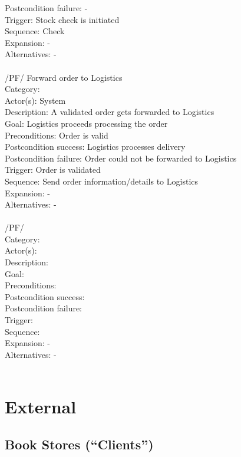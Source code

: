 \documentclass[11pt,a4paper,oneside,svgnames,draft]{report}
\begin{document}
\begin{tabbing}
	 Postcondition failure: \> -\\
	 Trigger: \> Stock check is initiated\\
	 Sequence: \> Check \\
	 Expansion: \> -\\
	 Alternatives: \> -\\
	 \\
	 /PF/ \> Forward order to Logistics\\ 
	 Category: \> \\
	 Actor(s): \> System\\ 
	 Description: \> A validated order gets forwarded to Logistics\\ 
	 Goal: \> Logistics proceeds processing the order\\
	 Preconditions: \> Order is valid\\
	 Postcondition success: \> Logistics processes delivery\\
	 Postcondition failure: \> Order could not be forwarded to Logistics\\
	 Trigger: \> Order is validated\\
	 Sequence: \> Send order information/details to Logistics\\
	 Expansion: \> -\\
	 Alternatives: \> -\\
	 \\
	 /PF/ \> \\ 
	 Category: \> \\
	 Actor(s): \> \\ 
	 Description: \> \\ 
	 Goal: \> \\
	 Preconditions: \> \\
	 Postcondition success: \> \\
	 Postcondition failure: \> \\
	 Trigger: \> \\
	 Sequence: \> \\
	 Expansion: \> -\\
	 Alternatives: \> -\\
	 \\
\end{tabbing} 
\clearpage

\section{External}
\subsection{Book Stores (``Clients'')}
\end{document}
